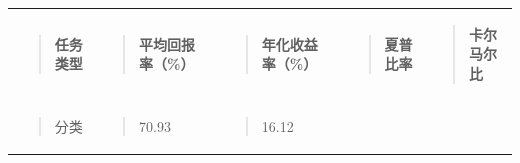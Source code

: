 \documentclass[UTF8]{ctexart}
\newcounter{none} %
\begin{document}
{\def\LTcaptype{none} %
\begin{longtable}[]{@{}
  >{\raggedright\arraybackslash}p{}
  >{\raggedright\arraybackslash}p{}
  >{\raggedright\arraybackslash}p{}
  >{\raggedright\arraybackslash}p{}
  >{\raggedright\arraybackslash}p{}@{}}
\toprule\noalign{}
\endhead
\bottomrule\noalign{}
\endlastfoot
\begin{minipage}[t]{\linewidth}\raggedright
\begin{quote}
\textbf{任务类型}
\end{quote}
\end{minipage} & \begin{minipage}[t]{\linewidth}\raggedright
\begin{quote}
\textbf{平均回报率（\%）}
\end{quote}
\end{minipage} & \begin{minipage}[t]{\linewidth}\raggedright
\begin{quote}
\textbf{年化收益率（\%）}
\end{quote}
\end{minipage} & \begin{minipage}[t]{\linewidth}\raggedright
\begin{quote}
\textbf{夏普比率}
\end{quote}
\end{minipage} & \begin{minipage}[t]{\linewidth}\raggedright
\begin{quote}
\textbf{卡尔马尔比}
\end{quote}
\end{minipage} \\
\begin{minipage}[t]{\linewidth}\raggedright
\begin{quote}
分类
\end{quote}
\end{minipage} & \begin{minipage}[t]{\linewidth}\raggedright
\begin{quote}
70.93
\end{quote}
\end{minipage} & \begin{minipage}[t]{\linewidth}\raggedright
\begin{quote}
16.12

\end{quote}
\end{minipage}
\end{longtable}}
\end{document}
